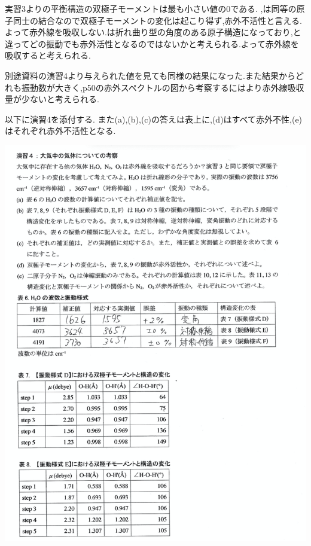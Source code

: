 \documentclass[a4j,10pt,dvipdfmx]{jarticle}
\begin{document}
  実習3よりの平衡構造の双極子モーメントは最も小さい値の0である.
  ,は同等の原子同士の結合なので双極子モーメントの変化は起こり得ず,赤外不活性と言える.よって赤外線を吸収しない.は折れ曲り型の角度のある原子構造になっており,と違ってどの振動でも赤外活性となるのではないかと考えられる.よって赤外線を吸収すると考えられる.

  別途資料の演習4より与えられた値を見ても同様の結果になった.また結果からどれも振動数が大きく,\cite{a}p50の赤外スペクトルの図から考察するにはより赤外線吸収量が少ないと考えられる.

  以下に演習4を添付する.
  また(a),(b),(c)の答えは表上に,(d)はすべて赤外不性,(e)はそれぞれ赤外不活性となる.

  \begin{center}
    \includegraphics[width=15cm]{en4.png}
  \end{center}
\end{document}
